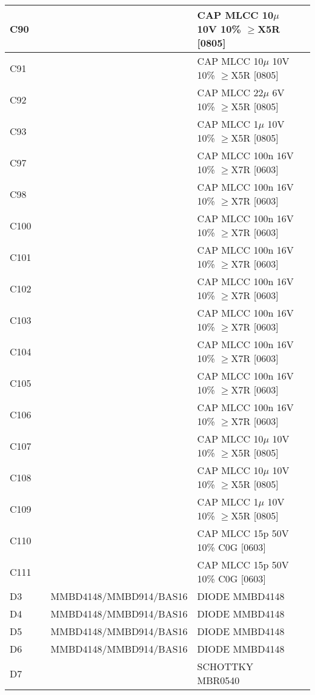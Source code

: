 \begin{longtable}{|l|l|l|l|l|}
\hline
C90 &  &  & CAP MLCC 10\ensuremath{\mu} 10V 10\% \ensuremath{\geq}X5R [0805] &  \\
\hline
C91 &  &  & CAP MLCC 10\ensuremath{\mu} 10V 10\% \ensuremath{\geq}X5R [0805] &  \\
\hline
C92 &  &  & CAP MLCC 22\ensuremath{\mu} 6V 10\% \ensuremath{\geq}X5R [0805] &  \\
\hline
C93 &  &  & CAP MLCC 1\ensuremath{\mu} 10V 10\% \ensuremath{\geq}X5R [0805] &  \\
\hline
C97 &  &  & CAP MLCC 100n 16V 10\% \ensuremath{\geq}X7R [0603] &  \\
\hline
C98 &  &  & CAP MLCC 100n 16V 10\% \ensuremath{\geq}X7R [0603] &  \\
\hline
C100 &  &  & CAP MLCC 100n 16V 10\% \ensuremath{\geq}X7R [0603] &  \\
\hline
C101 &  &  & CAP MLCC 100n 16V 10\% \ensuremath{\geq}X7R [0603] &  \\
\hline
C102 &  &  & CAP MLCC 100n 16V 10\% \ensuremath{\geq}X7R [0603] &  \\
\hline
C103 &  &  & CAP MLCC 100n 16V 10\% \ensuremath{\geq}X7R [0603] &  \\
\hline
C104 &  &  & CAP MLCC 100n 16V 10\% \ensuremath{\geq}X7R [0603] &  \\
\hline
C105 &  &  & CAP MLCC 100n 16V 10\% \ensuremath{\geq}X7R [0603] &  \\
\hline
C106 &  &  & CAP MLCC 100n 16V 10\% \ensuremath{\geq}X7R [0603] &  \\
\hline
C107 &  &  & CAP MLCC 10\ensuremath{\mu} 10V 10\% \ensuremath{\geq}X5R [0805] &  \\
\hline
C108 &  &  & CAP MLCC 10\ensuremath{\mu} 10V 10\% \ensuremath{\geq}X5R [0805] &  \\
\hline
C109 &  &  & CAP MLCC 1\ensuremath{\mu} 10V 10\% \ensuremath{\geq}X5R [0805] &  \\
\hline
C110 &  &  & CAP MLCC 15p 50V 10\% C0G [0603] &  \\
\hline
C111 &  &  & CAP MLCC 15p 50V 10\% C0G [0603] &  \\
\hline
D3 &  & MMBD4148/MMBD914/BAS16 & DIODE MMBD4148 &  \\
\hline
D4 &  & MMBD4148/MMBD914/BAS16 & DIODE MMBD4148 &  \\
\hline
D5 &  & MMBD4148/MMBD914/BAS16 & DIODE MMBD4148 &  \\
\hline
D6 &  & MMBD4148/MMBD914/BAS16 & DIODE MMBD4148 &  \\
\hline
D7 &  &  & SCHOTTKY MBR0540 &  \\

\end{longtable}
